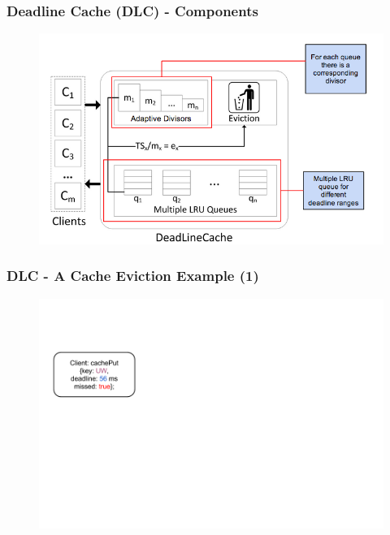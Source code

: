 \documentclass{beamer}
\begin{document}
\begin{frame}
  \frametitle{Deadline Cache (DLC) - Components}
  \begin{figure}
    \begin{center}
      \centerline{\includegraphics[scale=0.45]{img/DLC_ARC_2.png}}
    \end{center}
  \end{figure}
\end{frame}



\begin{frame}
  \frametitle{DLC - A Cache Eviction Example (1)}
  \begin{figure}
    \begin{center}
      \centerline{\includegraphics[scale=0.33]{img/DLC_V6_1.png}}
    \end{center}
  \end{figure}
\end{frame}
\end{document}

